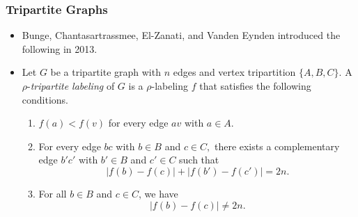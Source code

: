 \documentclass[11pt,serif,professionalfont,aspectratio=169]{beamer}
\theoremstyle{plain}
\begin{document}
\begin{frame}
\frametitle{Tripartite Graphs}
\begin{itemize}
\item Bunge, Chantasartrassmee, El-Zanati, and Vanden Eynden introduced the following in 2013.
\pause
\item Let $G$ be a tripartite graph with $n$ edges and vertex tripartition $\{A,B,C\}$. A $\rho$-\emph{tripartite labeling} of $G$ is a $\rho$-labeling $f$ that satisfies the following conditions.\pause
\begin{enumerate}
\item $f(a)<f(v)$ for every edge $av$ with $a \in A.$
\item For every edge $bc$ with $b \in B$ and $c \in C,$ there exists a complementary edge $b'c'$ with $b' \in B$ and $c' \in C$ such that 
\[ |f(b)-f(c)|+|f(b')-f(c')|=2n.
\]
\item For all $b \in B$ and $c \in C$, we have
\[|f(b)-f(c)| \neq 2n.
\]
\end{enumerate}
\end{itemize}


\end{frame}
\end{document}
